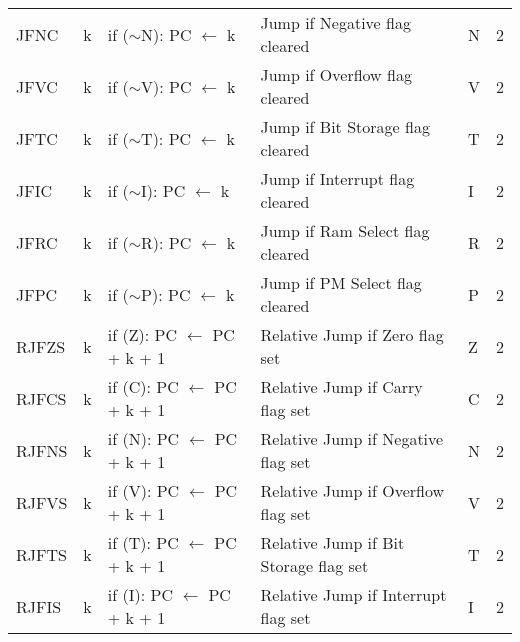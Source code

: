 \begin{footnotesize}
\begin{tabular}{|p{14.5mm}|p{14mm}|p{47mm}|p{46.5mm}|p{14mm}|p{10mm}|}
    JFNC     & k         & if ($\sim$N): PC $\leftarrow$ k                                        & Jump if Negative flag cleared             & N              & 2      \\
    JFVC     & k         & if ($\sim$V): PC $\leftarrow$ k                                        & Jump if Overflow flag cleared             & V              & 2      \\
    JFTC     & k         & if ($\sim$T): PC $\leftarrow$ k                                        & Jump if Bit Storage flag cleared          & T              & 2      \\
    JFIC     & k         & if ($\sim$I): PC $\leftarrow$ k                                        & Jump if Interrupt flag cleared            & I              & 2      \\
    JFRC     & k         & if ($\sim$R): PC $\leftarrow$ k                                        & Jump if Ram Select flag cleared           & R              & 2      \\
    JFPC     & k         & if ($\sim$P): PC $\leftarrow$ k                                        & Jump if PM Select flag cleared            & P              & 2      \\
    RJFZS    & k         & if (Z): PC $\leftarrow$ PC + k + 1                                     & Relative Jump if Zero flag set            & Z              & 2      \\
    RJFCS    & k         & if (C): PC $\leftarrow$ PC + k + 1                                     & Relative Jump if Carry flag set           & C              & 2      \\
    RJFNS    & k         & if (N): PC $\leftarrow$ PC + k + 1                                     & Relative Jump if Negative flag set        & N              & 2      \\
    RJFVS    & k         & if (V): PC $\leftarrow$ PC + k + 1                                     & Relative Jump if Overflow flag set        & V              & 2      \\
    RJFTS    & k         & if (T): PC $\leftarrow$ PC + k + 1                                     & Relative Jump \newline if Bit Storage flag set     & T              & 2      \\
    RJFIS    & k         & if (I): PC $\leftarrow$ PC + k + 1                                     & Relative Jump \newline if Interrupt flag set       & I              & 2      \\

\end{tabular}
\end{footnotesize}
